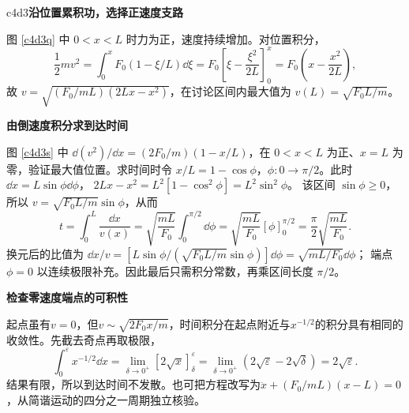 \begin{drillsolution}{c4d3}\textbf{沿位置累积功，选择正速度支路}\par\nobreak
图 \ref{c4d3q} 中 $0<x<L$ 时力为正，速度持续增加。对位置积分，
\[
 \frac12mv^2=\int_0^xF_0(1-\xi/L)\dd\xi
 =F_0\left[\xi-\frac{\xi^2}{2L}\right]_0^x
 =F_0\left(x-\frac{x^2}{2L}\right),
\]
故 $v=\sqrt{(F_0/mL)(2Lx-x^2)}$，在讨论区间内最大值为 $v(L)=\sqrt{F_0L/m}$。



\par\medskip{}\noindent\textbf{由倒速度积分求到达时间}\par\nobreak
图 \ref{c4d3s} 中 $\dd(v^2)/\dd x=(2F_0/m)(1-x/L)$，在 $0<x<L$ 为正、$x=L$ 为零，验证最大值位置。求时间时令 $x/L=1-\cos\phi$，$\phi:0\to\pi/2$。此时
$\dd x=L\sin\phi\dd\phi$，
$2Lx-x^2=L^2[1-\cos^2\phi]=L^2\sin^2\phi$。
该区间 $\sin\phi\ge0$，所以 $v=\sqrt{F_0L/m}\sin\phi$，从而
\[
 t=\int_0^L\frac{\dd x}{v(x)}
 =\sqrt{\frac{mL}{F_0}}\int_0^{\pi/2}\dd\phi
 =\sqrt{\frac{mL}{F_0}}[\phi]_0^{\pi/2}
 =\boxed{\frac\pi2\sqrt{\frac{mL}{F_0}}}.
\]
换元后的比值为
$\dd x/v=[L\sin\phi/(\sqrt{F_0L/m}\sin\phi)]\dd\phi=\sqrt{mL/F_0}\dd\phi$；
端点 $\phi=0$ 以连续极限补充。因此最后只需积分常数，再乘区间长度 $\pi/2$。


\par\medskip{}\noindent\textbf{检查零速度端点的可积性}\par\nobreak
起点虽有$v=0$，但$v\sim\sqrt{2F_0x/m}$，时间积分在起点附近与$x^{-1/2}$的积分具有相同的收敛性。先截去奇点再取极限，
\[
\int_0^\varepsilon x^{-1/2}\dd x
=\lim_{\delta\to0^+}[2\sqrt x]_\delta^\varepsilon
=\lim_{\delta\to0^+}(2\sqrt\varepsilon-2\sqrt\delta)
=2\sqrt\varepsilon.
\]
结果有限，所以到达时间不发散。也可把方程改写为$\ddot x+(F_0/mL)(x-L)=0$，从简谐运动的四分之一周期独立核验。
\end{drillsolution}
